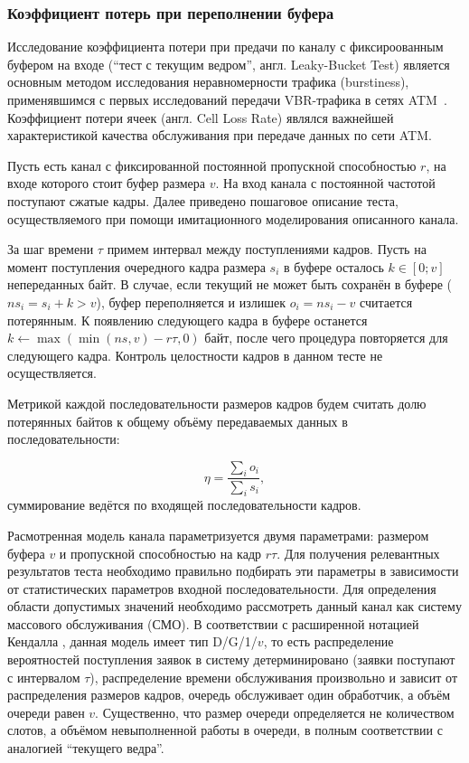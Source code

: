 \subsubsection{Коэффициент потерь при переполнении буфера}
\label{sse:bucket}
\hspace{3pt}

Исследование коэффициента потери при предачи по каналу
с фиксироованным буфером на входе (``тест с текущим ведром'',
англ. Leaky-Bucket Test) является основным
методом исследования неравномерности трафика (burstiness),
применявшимся с первых исследований передачи VBR-трафика
в сетях ATM~\cite{heymanATM, heymansourcemodels}.
Коэффициент потери ячеек (англ. Cell Loss Rate) являлся
важнейшей характеристикой качества обслуживания при передаче
данных по сети ATM.

Пусть есть канал с фиксированной постоянной пропускной
способностью $r$, на входе которого стоит буфер размера $v$.
На вход канала с постоянной частотой поступают сжатые
кадры. Далее приведено пошаговое описание теста, осуществляемого
при помощи имитационного моделирования описанного канала.

За шаг времени $\tau$ примем интервал между поступлениями
кадров. Пусть на момент поступления очередного кадра размера
$s_i$ в буфере осталось $k \in [0; v]$ непереданных байт.
В случае, если текущий не может быть сохранён
в буфере ($ns_i = s_i + k > v$), буфер переполняется и излишек $o_i = ns_i - v$
считается потерянным. К появлению следующего кадра
в буфере останется $k \leftarrow \max(\min(ns, v) - r\tau, 0)$ байт,
после чего процедура повторяется для следующего кадра.
Контроль целостности кадров в данном тесте не осуществляется.

Метрикой каждой последовательности размеров кадров будем считать
долю потерянных байтов к общему объёму передаваемых данных
в последовательности:

\begin{equation}
    \eta = \frac{\sum_i o_i}{\sum_i s_i},
\end{equation}
суммирование ведётся по входящей последовательности кадров.

Расмотренная модель канала параметризуется двумя параметрами:
размером буфера $v$ и пропускной способностью на кадр $r\tau$.
Для получения релевантных результатов теста необходимо правильно
подбирать эти параметры в зависимости от статистических параметров
входной последовательности. Для определения области допустимых значений
необходимо рассмотреть данный канал как систему массового обслуживания
\cite{bertsekas}
(СМО). В соответствии с расширенной нотацией Кендалла
\cite{kendall},
данная модель имеет тип D/G/1/$v$, то есть распределение
вероятностей поступления заявок в систему детерминировано
(заявки поступают с интервалом $\tau$), распределение
времени обслуживания произвольно и зависит от распределения
размеров кадров, очередь обслуживает один обработчик,
а объём очереди равен $v$. Существенно, что размер очереди
определяется не количеством слотов, а объёмом невыполненной
работы в очереди, в полным соответствии с аналогией ``текущего
ведра''.

